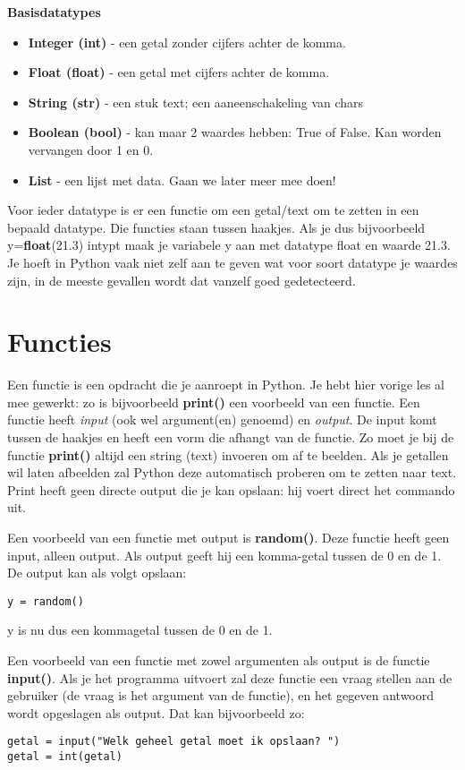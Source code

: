 \textbf{Basisdatatypes}
\begin{itemize}
\item \textbf{Integer (int)} - een getal zonder cijfers achter de komma.
\item \textbf{Float (float)} - een getal met cijfers achter de komma.
\item \textbf{String (str)} - een stuk text; een aaneenschakeling van chars
\item \textbf{Boolean (bool)} - kan maar 2 waardes hebben: True of False. Kan worden vervangen door 1 en 0. 
\item \textbf{List} - een lijst met data. Gaan we later meer mee doen!
\end{itemize}

Voor ieder datatype is er een functie om een getal/text om te zetten in een bepaald datatype. Die functies staan tussen haakjes. Als je dus bijvoorbeeld y=\textbf{float}(21.3) intypt maak je variabele y aan met datatype float en waarde 21.3. Je hoeft in Python vaak niet zelf aan te geven wat voor soort datatype je waardes zijn, in de meeste gevallen wordt dat vanzelf goed gedetecteerd.

\section{Functies}

Een functie is een opdracht die je aanroept in Python. Je hebt hier vorige les al mee gewerkt: zo is bijvoorbeeld \textbf{print()} een voorbeeld van een functie. Een functie heeft  \textit{input} (ook wel argument(en) genoemd) en \textit{output}. De input komt tussen de haakjes en heeft een vorm die afhangt van de functie. Zo moet je bij de functie \textbf{print()}  altijd een string (text) invoeren om af te beelden. Als je getallen wil laten afbeelden zal Python deze automatisch proberen om te zetten naar text. Print heeft geen directe output die je kan opslaan: hij voert direct het commando uit.

Een voorbeeld van een functie met output is \textbf{random()}. Deze functie heeft geen input, alleen output. Als output geeft hij een komma-getal tussen de 0 en de 1. De output kan als volgt opslaan:
\begin{lstlisting}[frame=single]
y = random() 
\end{lstlisting}
y is nu dus een kommagetal tussen de 0 en de 1. 

Een voorbeeld van een functie met zowel argumenten als output is de functie \textbf{input()}. Als je het programma uitvoert zal deze functie een vraag stellen aan de gebruiker (de vraag is het argument van de functie), en het gegeven antwoord wordt opgeslagen als output. Dat kan bijvoorbeeld zo:
\begin{lstlisting}[frame=single]
getal = input("Welk geheel getal moet ik opslaan? ")
getal = int(getal)
\end{lstlisting}

